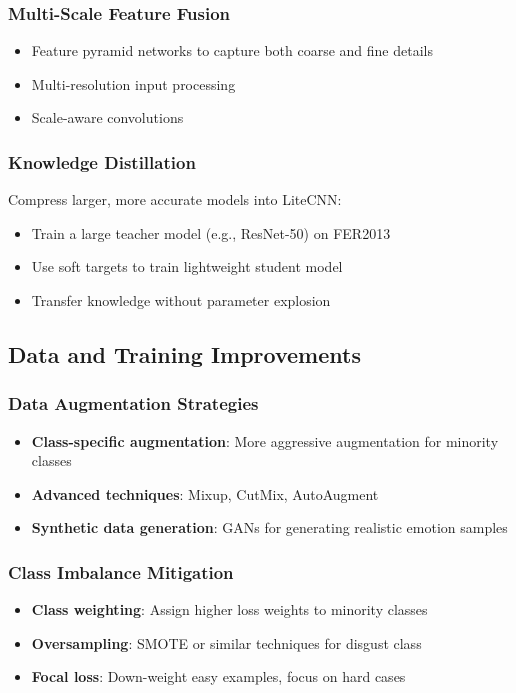 \documentclass[12pt,a4paper]{article}
\begin{document}
\subsubsection{Multi-Scale Feature Fusion}
\begin{itemize}[leftmargin=*]
    \item Feature pyramid networks to capture both coarse and fine details
    \item Multi-resolution input processing
    \item Scale-aware convolutions
\end{itemize}

\subsubsection{Knowledge Distillation}
Compress larger, more accurate models into LiteCNN:
\begin{itemize}[leftmargin=*]
    \item Train a large teacher model (e.g., ResNet-50) on FER2013
    \item Use soft targets to train lightweight student model
    \item Transfer knowledge without parameter explosion
\end{itemize}

\subsection{Data and Training Improvements}

\subsubsection{Data Augmentation Strategies}
\begin{itemize}[leftmargin=*]
    \item \textbf{Class-specific augmentation}: More aggressive augmentation for minority classes
    \item \textbf{Advanced techniques}: Mixup, CutMix, AutoAugment
    \item \textbf{Synthetic data generation}: GANs for generating realistic emotion samples
\end{itemize}

\subsubsection{Class Imbalance Mitigation}
\begin{itemize}[leftmargin=*]
    \item \textbf{Class weighting}: Assign higher loss weights to minority classes
    \item \textbf{Oversampling}: SMOTE or similar techniques for disgust class
    \item \textbf{Focal loss}: Down-weight easy examples, focus on hard cases
\end{itemize}
\end{document}
